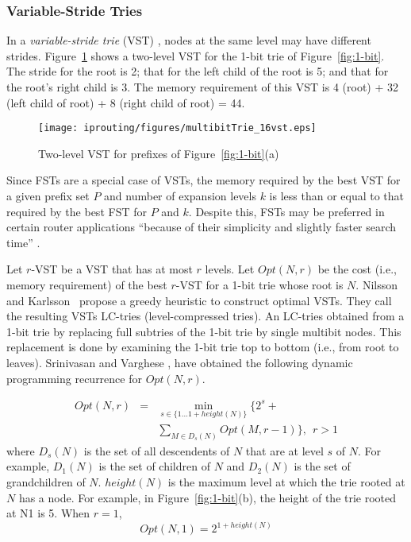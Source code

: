 \subsubsection{Variable-Stride Tries}
\label{variable}
In a {\em variable-stride trie} (VST) \cite{sri:expansion},
nodes at the same level may have
different strides. Figure~\ref{fig:variable} shows a two-level VST for the
1-bit trie of Figure~\ref{fig:1-bit}. The stride for the root is 2;
that for the left child of the root is 5; and that for the root's right
child is 3. The memory requirement of this VST is 4 (root) + 32
(left child of root) + 8 (right child of root) = 44.


\begin{figure}
	\begin{center}
        \texttt{[image: iprouting/figures/multibitTrie\_16vst.eps]}
        \end{center}
\caption{Two-level VST for prefixes of Figure~\ref{fig:1-bit}(a)}
\label{fig:variable}
\end{figure}


Since FSTs are a special case of VSTs, the memory required by the 
best VST for a given prefix set $P$ and number of expansion levels $k$
is less than or equal to that required by the best FST for $P$ and $k$.
Despite this, FSTs may be preferred in certain router applications
``because of their simplicity and slightly
faster search time'' \cite{sri:expansion}.

Let $r$-VST be a VST that has at most $r$ levels.
Let $Opt(N,r)$ be the cost (i.e., memory requirement) of the best
$r$-VST for a 1-bit trie whose root is $N$.
Nilsson and Karlsson~\cite{nils} propose a greedy
heuristic to construct optimal VSTs.
They call the resulting VSTs LC-tries (level-compressed tries).
An LC-tries obtained from a 1-bit trie by replacing full subtries of the 1-bit
trie by single multibit nodes. This replacement is done by examining the
1-bit trie top to bottom (i.e., from root to leaves). 
Srinivasan and Varghese \cite{sri:expansion},
have obtained the following dynamic programming recurrence for
$Opt(N,r)$.


\begin{eqnarray}
Opt(N, r) &=& \min_{s \in \{1 \ldots 1+height(N)\}} \{2^{s} +\nonumber \\
& & \sum_{M \in D_s(N)}Opt(M,r-1)\}, \ \ r > 1\label{eq:var1}
\end{eqnarray}
where $D_s(N)$ is the set of all descendents of $N$ that are
at level $s$ of $N$. For example, $D_1(N)$ is the set of children of $N$ and
$D_2(N)$ is the set of grandchildren of $N$.
$height(N)$ is the maximum level at which the trie rooted at $N$ has a node.
For example, in Figure~\ref{fig:1-bit}(b), the height of the trie rooted at N1
is 5.
When $r = 1$, 
\begin{equation}\label{eq:var2}
Opt(N, 1) = 2^{1+height(N)}
\end{equation}

